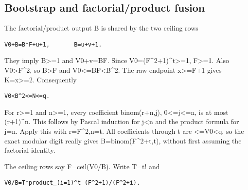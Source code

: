 \subsection{Bootstrap and factorial/\allowbreak{}product fusion}



The factorial/\allowbreak{}product output B is shared by the two ceiling rows



\begin{verbatim}
V0+B=B*F+u+1,       B=u+v+1.
\end{verbatim}

They imply B\textgreater{}\allowbreak{}=\allowbreak{}1 and V0+\allowbreak{}v=\allowbreak{}BF. Since V0=\allowbreak{}(F\textasciicircum{}\allowbreak{}2+\allowbreak{}1)\textasciicircum{}\allowbreak{}t\textgreater{}\allowbreak{}=\allowbreak{}1, F\textgreater{}\allowbreak{}=\allowbreak{}1. Also V0\textgreater{}\allowbreak{}F\textasciicircum{}\allowbreak{}2, so B\textgreater{}\allowbreak{}F and V0\textless{}\allowbreak{}=\allowbreak{}BF\textless{}\allowbreak{}B\textasciicircum{}\allowbreak{}2. The raw endpoint x\textgreater{}\allowbreak{}=\allowbreak{}F+\allowbreak{}1 gives K=\allowbreak{}x\textgreater{}\allowbreak{}=\allowbreak{}2. Consequently



\begin{verbatim}
V0<B^2<=N<=q.
\end{verbatim}

For r\textgreater{}\allowbreak{}=\allowbreak{}1 and n\textgreater{}\allowbreak{}=\allowbreak{}1, every coefficient binom(r+\allowbreak{}n,j), 0\textless{}\allowbreak{}=\allowbreak{}j\textless{}\allowbreak{}=\allowbreak{}n, is at most (r+\allowbreak{}1)\textasciicircum{}\allowbreak{}n. This follows by Pascal induction for j\textless{}\allowbreak{}n and the product formula for j=\allowbreak{}n. Apply this with r=\allowbreak{}F\textasciicircum{}\allowbreak{}2,n=\allowbreak{}t. All coefficients through t are \textless{}\allowbreak{}=\allowbreak{}V0\textless{}\allowbreak{}q, so the exact modular digit really gives B=\allowbreak{}binom(F\textasciicircum{}\allowbreak{}2+\allowbreak{}t,t), without first assuming the factorial identity.



The ceiling rows say F=\allowbreak{}ceil(V0/\allowbreak{}B). Write T=\allowbreak{}t! and



\begin{verbatim}
V0/B=T*product_(i=1)^t (F^2+1)/(F^2+i).
\end{verbatim}

